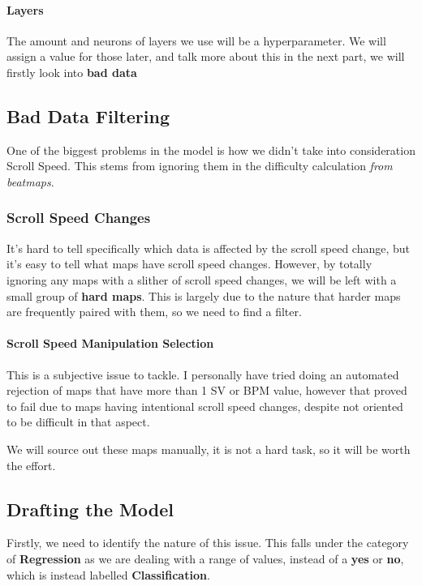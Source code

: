 \paragraph{Layers} The amount and neurons of layers we use will be a hyperparameter. We will assign a value for those later, and talk more about this in the next part, we will firstly look into \textbf{bad data}

\subsection{Bad Data Filtering}

One of the biggest problems in the model is how we didn't take into consideration Scroll Speed. This stems from ignoring them in the difficulty calculation \textit{from beatmaps}.

\subsubsection{Scroll Speed Changes}

It's hard to tell specifically which data is affected by the scroll speed change, but it's easy to tell what maps have scroll speed changes. However, by totally ignoring any maps with a slither of scroll speed changes, we will be left with a small group of \textbf{hard maps}. This is largely due to the nature that harder maps are frequently paired with them, so we need to find a filter.

\paragraph{Scroll Speed Manipulation Selection}

This is a subjective issue to tackle. I personally have tried doing an automated rejection of maps that have more than 1 SV or BPM value, however that proved to fail due to maps having intentional scroll speed changes, despite not oriented to be difficult in that aspect.

We will source out these maps manually, it is not a hard task, so it will be worth the effort.

\subsection{Drafting the Model}

Firstly, we need to identify the nature of this issue. This falls under the category of \textbf{Regression} as we are dealing with a range of values, instead of a \textbf{yes} or \textbf{no}, which is instead labelled \textbf{Classification}.

